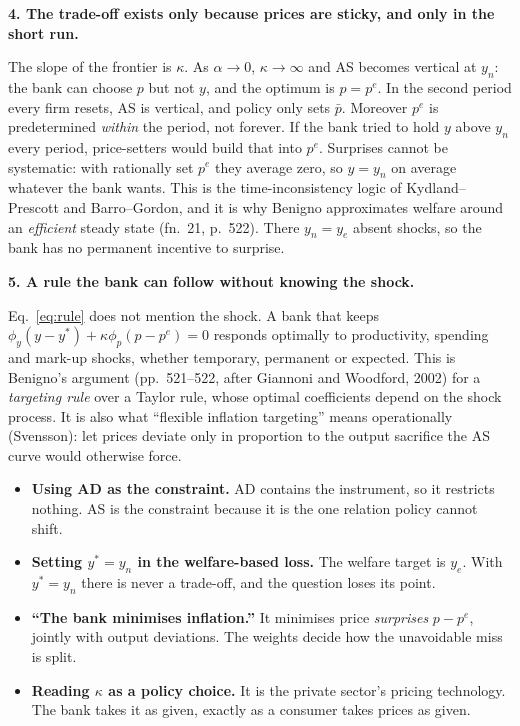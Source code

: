 \documentclass[11pt, a4paper]{article}
\newcommand{\passo}[1]{\medskip\noindent\textbf{#1}\par\nobreak}
\newcommand{\pbar}{\bar p}
\begin{document}
\passo{4. The trade-off exists only because prices are sticky, and only in the short run.}
The slope of the frontier is $\kappa$. As $\alpha\to0$, $\kappa\to\infty$ and AS becomes
vertical at $y_n$: the bank can choose $p$ but not $y$, and the optimum is $p=p^e$. In the
second period every firm resets, AS is vertical, and policy only sets $\pbar$. Moreover $p^e$
is predetermined \emph{within} the period, not forever. If the bank tried to hold $y$ above
$y_n$ every period, price-setters would build that into $p^e$. Surprises cannot be
systematic: with rationally set $p^e$ they average zero, so $y=y_n$ on average whatever the
bank wants. This is the time-inconsistency logic of Kydland--Prescott and Barro--Gordon, and
it is why Benigno approximates welfare around an \emph{efficient} steady state
(fn.~21, p.~522). There $y_n=y_e$ absent shocks, so the bank has no permanent incentive to
surprise.

\passo{5. A rule the bank can follow without knowing the shock.}
Eq.\ \eqref{eq:rule} does not mention the shock. A bank that keeps
$\phi_y(y-y^\ast)+\kappa\phi_p(p-p^e)=0$ responds optimally to productivity, spending and
mark-up shocks, whether temporary, permanent or expected. This is Benigno's argument
(pp.~521--522, after Giannoni and Woodford, 2002) for a \emph{targeting rule} over a Taylor
rule, whose optimal coefficients depend on the shock process. It is also what ``flexible
inflation targeting'' means operationally (Svensson): let prices deviate only in proportion
to the output sacrifice the AS curve would otherwise force.

\begin{tcolorbox}[trapbox, title={Traps in Question 4}]
\small
\begin{itemize}
\item \textbf{Using AD as the constraint.} AD contains the instrument, so it restricts
      nothing. AS is the constraint because it is the one relation policy cannot shift.
\item \textbf{Setting $y^\ast=y_n$ in the welfare-based loss.} The welfare target is $y_e$.
      With $y^\ast=y_n$ there is never a trade-off, and the question loses its point.
\item \textbf{``The bank minimises inflation.''} It minimises price \emph{surprises}
      $p-p^e$, jointly with output deviations. The weights decide how the unavoidable miss
      is split.
\item \textbf{Reading $\kappa$ as a policy choice.} It is the private sector's pricing
      technology. The bank takes it as given, exactly as a consumer takes prices as given.
\end{itemize}
\end{tcolorbox}
\end{document}
